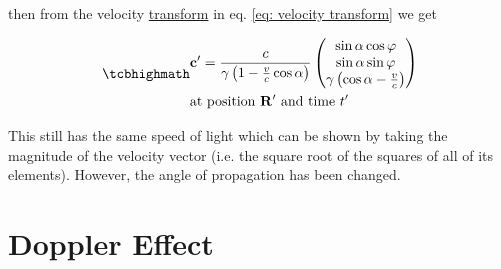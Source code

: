then from the velocity \hyperlink{def-transform}{transform} in eq. \eqref{eq: velocity transform} we get


\begin{equation}
	\label{eq: velocity transform for light}
	\mhl{
		\begin{aligned}
			 & \mathbf{c}' = \dfrac{c}{\gamma\left(1- \frac{v}{c} \cos\alpha\right) }
			\begin{pmatrix}
				\sin\alpha\cos\varphi                          \\
				\sin\alpha\sin\varphi                          \\
				\gamma \left( \cos\alpha - \frac{v}{c} \right) \\
			\end{pmatrix}
			\\
			 & \text{at position $\mathbf{R}'$ and time $t'$ }
		\end{aligned}
	}
\end{equation}

This still has the same speed of light which can be shown by taking the magnitude of the velocity vector (i.e. the square root of the squares of all of its elements). However, the angle of propagation has been changed.

\section{Doppler Effect}

